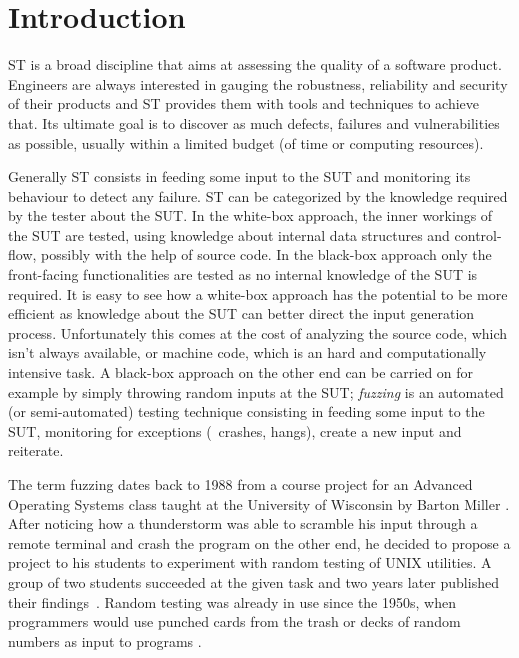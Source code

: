 \chapter{Introduction}
\label{chap:intro}

\ac{ST} is a broad discipline that aims at assessing the quality of a
software product. Engineers are always interested in gauging the robustness,
reliability and security of their products and \ac{ST} provides them with tools
and techniques to achieve that. Its ultimate goal is to discover as much defects,
failures and vulnerabilities as possible, usually within a limited budget (of
time or computing resources).

Generally \ac{ST} consists in feeding some input to the \ac{SUT} and monitoring
its behaviour to detect any failure. \ac{ST} can be categorized by the knowledge
required by the tester about the \ac{SUT}. In the white-box approach, the inner
workings of the \ac{SUT} are tested, using knowledge about internal data
structures and control-flow, possibly with the help of source code. In the
black-box approach only the front-facing functionalities are tested as no
internal knowledge of the \ac{SUT} is required. It is easy to see how a
white-box approach has the potential to be more efficient as knowledge about the
\ac{SUT} can better direct the input generation process. Unfortunately this
comes at the cost of analyzing the source code, which isn't always available, or
machine code, which is an hard and computationally intensive task. A black-box
approach on the other end can be carried on for example by simply throwing
random inputs at the \ac{SUT}; \emph{fuzzing} is an automated (or
semi-automated) testing technique consisting in feeding some input to the
\ac{SUT}, monitoring for exceptions (\ie~crashes, hangs), create a new input and
reiterate.

The term fuzzing dates back to 1988 from a course project for an Advanced
Operating Systems class taught at the University of Wisconsin by Barton Miller
\cite{takanen2008fuzzing}. After noticing how a thunderstorm was able to
scramble his input through a remote terminal and crash the program on the other
end, he decided to propose a project to his students to experiment with random
testing of UNIX utilities. A group of two students succeeded at the given task
and two years later published their findings~\cite{miller1990empirical}. Random
testing was already in use since the 1950s, when programmers would use punched
cards from the trash or decks of random numbers as input to programs
\cite{weinberg2008}.

